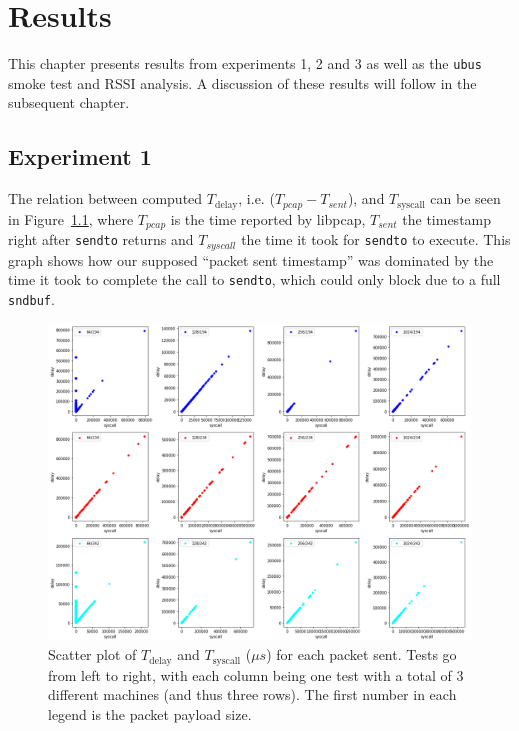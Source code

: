 
\chapter{Results}

This chapter presents results from experiments 1, 2 and 3 as well as the
\texttt{ubus} smoke test and RSSI analysis. A discussion of these results will
follow in the subsequent chapter.

\section{Experiment 1}

The relation between computed $T_\text{delay}$, i.e. ($T_{pcap} - T_{sent}$), and
$T_\text{syscall}$ can be seen in Figure~\ref{fig:sysdelay}, where $T_{pcap}$
is the time reported by libpcap, $T_{sent}$ the timestamp right after
\texttt{sendto} returns and $T_{syscall}$ the time it took for \texttt{sendto}
to execute. This graph shows how our supposed ``packet sent timestamp'' was
dominated by the time it took to complete the call to \texttt{sendto}, which
could only block due to a full \texttt{sndbuf}.

\begin{figure}[tbp]
  \centering
  \includegraphics[width=1.2\textwidth]{images/delay-vs-syscall.png}
  \caption{Scatter plot of $T_\text{delay}$ and $T_\text{syscall}$ ($\mu s$) for each packet sent. Tests go from left to right, with each column being one test with a total of 3 different machines (and thus three rows). The first number in each legend is the packet payload size.}
  \label{fig:sysdelay}
\end{figure}

